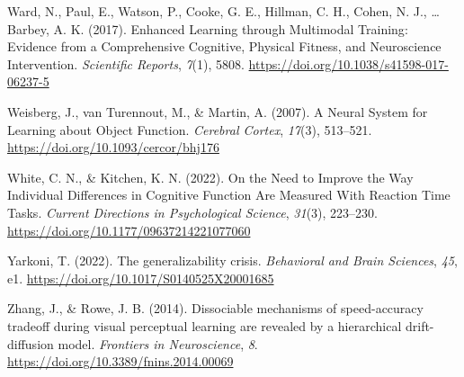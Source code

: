 \documentclass[
  man, donotrepeattitle,floatsintext]{apa6}
\newlength{\cslhangindent}
\newenvironment{CSLReferences}[2] %
 {\begin{list}{}{%
  \setlength{\itemindent}{0pt}
  \setlength{\leftmargin}{0pt}
  \setlength{\parsep}{0pt}
  \ifodd #1
   \setlength{\leftmargin}{\cslhangindent}
   \setlength{\itemindent}{-1\cslhangindent}
  \fi
  \setlength{\itemsep}{#2\baselineskip}}}
 {\end{list}}
\begin{document}
\begin{CSLReferences}{1}{0}
Ward, N., Paul, E., Watson, P., Cooke, G. E., Hillman, C. H., Cohen, N. J., \ldots{} Barbey, A. K. (2017). Enhanced {Learning} through {Multimodal Training}: {Evidence} from a {Comprehensive Cognitive}, {Physical Fitness}, and {Neuroscience Intervention}. \emph{Scientific Reports}, \emph{7}(1), 5808. \url{https://doi.org/10.1038/s41598-017-06237-5}

Weisberg, J., van Turennout, M., \& Martin, A. (2007). A {Neural System} for {Learning} about {Object Function}. \emph{Cerebral Cortex}, \emph{17}(3), 513--521. \url{https://doi.org/10.1093/cercor/bhj176}

White, C. N., \& Kitchen, K. N. (2022). On the {Need} to {Improve} the {Way Individual Differences} in {Cognitive Function Are Measured With Reaction Time Tasks}. \emph{Current Directions in Psychological Science}, \emph{31}(3), 223--230. \url{https://doi.org/10.1177/09637214221077060}

Yarkoni, T. (2022). The generalizability crisis. \emph{Behavioral and Brain Sciences}, \emph{45}, e1. \url{https://doi.org/10.1017/S0140525X20001685}

Zhang, J., \& Rowe, J. B. (2014). Dissociable mechanisms of speed-accuracy tradeoff during visual perceptual learning are revealed by a hierarchical drift-diffusion model. \emph{Frontiers in Neuroscience}, \emph{8}. \url{https://doi.org/10.3389/fnins.2014.00069}

\end{CSLReferences}
\end{document}
